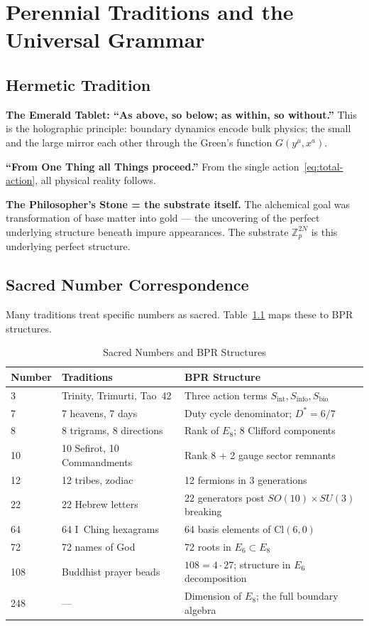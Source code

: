 \documentclass[12pt,oneside]{book}
\theoremstyle{definition}
\newcommand{\EEight}{E_8}
\begin{document}
\chapter{Perennial Traditions and the Universal Grammar}
\label{chap:perennial}

\section{Hermetic Tradition}

\noindent\textbf{The Emerald Tablet: ``As above, so below; as within, so without.''}
This is the holographic principle: boundary dynamics encode bulk physics; the small
and the large mirror each other through the Green's function $G(y^\mu, x^a)$.

\noindent\textbf{``From One Thing all Things proceed.''}
From the single action~\eqref{eq:total-action}, all physical reality follows.

\noindent\textbf{The Philosopher's Stone = the substrate itself.}
The alchemical goal was transformation of base matter into gold --- the
uncovering of the perfect underlying structure beneath impure appearances.
The substrate $\mathbb{Z}_p^{2N}$ is this underlying perfect structure.

\section{Sacred Number Correspondence}

Many traditions treat specific numbers as sacred. Table~\ref{tab:sacred-numbers}
maps these to BPR structures.

\begin{longtable}{@{}lll@{}}
  \caption{Sacred Numbers and BPR Structures}
  \label{tab:sacred-numbers}\\
  \toprule\textbf{Number} & \textbf{Traditions} & \textbf{BPR Structure}\\
  \midrule\endfirsthead\midrule\endhead
  3 & Trinity, Trimurti, Tao~42 & Three action terms $S_{\mathrm{int}}, S_{\mathrm{info}}, S_{\mathrm{bio}}$\\
  7 & 7 heavens, 7 days & Duty cycle denominator; $D^* = 6/7$\\
  8 & 8 trigrams, 8 directions & Rank of $\EEight$; 8 Clifford components\\
  10 & 10 Sefirot, 10 Commandments & Rank 8 + 2 gauge sector remnants\\
  12 & 12 tribes, zodiac & 12 fermions in 3 generations\\
  22 & 22 Hebrew letters & 22 generators post $SO(10)\times SU(3)$ breaking\\
  64 & 64 I~Ching hexagrams & 64 basis elements of $\mathrm{Cl}(6,0)$\\
  72 & 72 names of God & 72 roots in $E_6 \subset E_8$\\
  108 & Buddhist prayer beads & $108 = 4 \cdot 27$; structure in $E_6$ decomposition\\
  248 & --- & Dimension of $\EEight$; the full boundary algebra\\
  \bottomrule
\end{longtable}
\end{document}

